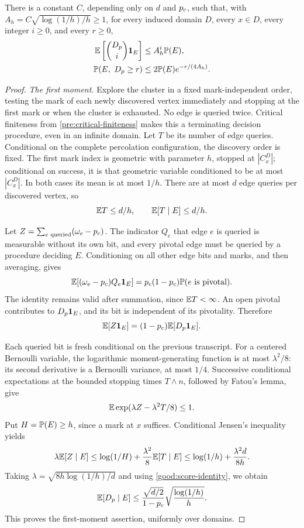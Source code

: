 \begin{lemma}\label{good:marked-pivotals}
There is a constant $C$, depending only on $d$ and ${p_c}$, such that,
with
$A_h=C\sqrt{\log(1/h)/h}\ge1$, for every induced domain $D$, every
$x\in D$, every integer $i\ge0$, and every $r\ge0$,
\begin{equation}\label{eq:s07}
 \begin{aligned}
 \mathbb E\left[\binom{D_p}{i}\mathbf 1_E\right]
 &\le A_h^i\mathbb P(E),\\
 \mathbb P(E,\ D_p\ge r)
 &\le2\mathbb P(E)e^{-r/(4A_h)}.
 \end{aligned}
\end{equation}
\end{lemma}
\begin{proof}
\emph{The first moment.}
Explore the cluster in a fixed mark-independent order, testing the
mark of each newly discovered vertex immediately and stopping at the
first mark or when the cluster is exhausted. No edge is queried twice.
Critical finiteness from \cref{pre:critical-finiteness} makes this a
terminating decision procedure, even in an infinite domain.
Let $T$ be its number of edge queries. Conditional on the complete
percolation configuration, the discovery order is fixed. The first
mark index is geometric with parameter $h$, stopped at $|C_x^D|$;
conditional on success, it is that geometric variable conditioned to
be at most $|C_x^D|$. In both cases its mean is at most $1/h$.
There are at most $d$ edge queries per discovered vertex, so
\[
 \mathbb E T\le d/h,\qquad \mathbb E[T\mid E]\le d/h.
\]

Let $Z=\sum_{e\text{ queried}}(\omega_e-{p_c})$. The indicator $Q_e$
that edge $e$ is queried is measurable without its own bit, and every
pivotal edge must be queried by a procedure deciding $E$. Conditioning
on all other edge bits and marks, and then averaging, gives
\[
 \mathbb E[(\omega_e-{p_c})Q_e\mathbf 1_E]
 ={p_c}(1-{p_c})\mathbb P(e\text{ is pivotal}).
\]
The identity remains valid after summation, since $\mathbb E T<\infty$.
An open pivotal contributes to $D_p\mathbf 1_E$, and its bit is independent
of its pivotality. Therefore
\begin{equation}\label{good:score-identity}
 \mathbb E[Z\mathbf 1_E]=(1-{p_c})\mathbb E[D_p\mathbf 1_E].
\end{equation}

Each queried bit is fresh conditional on the previous transcript.
For a centered Bernoulli variable, the logarithmic moment-generating
function is at most $\lambda^2/8$: its second derivative is a
Bernoulli variance, at most $1/4$. Successive conditional
expectations at the bounded stopping times $T\wedge n$, followed by
Fatou's lemma, give
\[
 \mathbb E\exp(\lambda Z-\lambda^2T/8)\le1.
\]
Put $H=\mathbb P(E)\ge h$, since a mark at $x$ suffices. Conditional
Jensen's inequality yields
\[
 \lambda\mathbb E[Z\mid E]
 \le\log(1/H)+\frac{\lambda^2}{8}\mathbb E[T\mid E]
 \le\log(1/h)+\frac{\lambda^2d}{8h}.
\]
Taking $\lambda=\sqrt{8h\log(1/h)/d}$ and using
\eqref{good:score-identity}, we obtain
\[
 \mathbb E[D_p\mid E]
 \le\frac{\sqrt{d/2}}{1-{p_c}}
       \sqrt{\frac{\log(1/h)}h}.
\]
This proves the first-moment assertion, uniformly over domains.


\end{proof}
